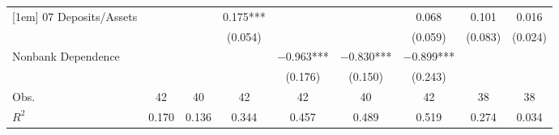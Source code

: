 {\begin{tabular}{l*{8}{c}}
[1em]
07 Deposits/Assets  &               &               &       0.175***&               &               &       0.068   &       0.101   &       0.016   \\
                    &               &               &     (0.054)   &               &               &     (0.059)   &     (0.083)   &     (0.024)   \\
[1em]
Nonbank Dependence  &               &               &               &    $-$0.963***&    $-$0.830***&    $-$0.899***&               &               \\
                    &               &               &               &     (0.176)   &     (0.150)   &     (0.243)   &               &               \\
\toprule
Obs.                &          42   &          40   &          42   &          42   &          40   &          42   &          38   &          38   \\
$R^2$               &       0.170   &       0.136   &       0.344   &       0.457   &       0.489   &       0.519   &       0.274   &       0.034   \\
\toprule\toprule
\end{tabular}
}
